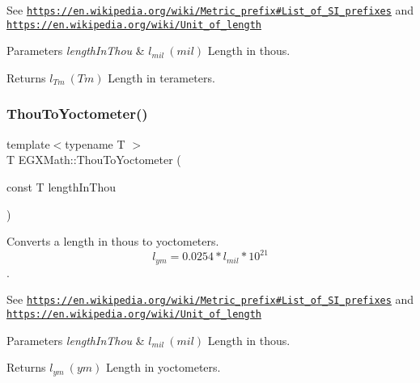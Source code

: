 See \href{https://en.wikipedia.org/wiki/Metric_prefix#List_of_SI_prefixes}{\tt https\+://en.\+wikipedia.\+org/wiki/\+Metric\+\_\+prefix\#\+List\+\_\+of\+\_\+\+S\+I\+\_\+prefixes} and \href{https://en.wikipedia.org/wiki/Unit_of_length}{\tt https\+://en.\+wikipedia.\+org/wiki/\+Unit\+\_\+of\+\_\+length} 
\begin{DoxyParams}{Parameters}
{\em length\+In\+Thou} & $ l_{mil}\ (mil)$ Length in thous. \\
\hline
\end{DoxyParams}
\begin{DoxyReturn}{Returns}
$ l_{Tm}\ (Tm)$ Length in terameters. 
\end{DoxyReturn}
\mbox{\label{group___e_g_x_math-_conversions-_length_conversions-_imperial-_thou-_s_i_ga9d6f9fc2ae199f7d67e0eff86cc17caf}} 
\subsubsection{\texorpdfstring{Thou\+To\+Yoctometer()}{ThouToYoctometer()}}
{\footnotesize\ttfamily template$<$typename T $>$ \\
T E\+G\+X\+Math\+::\+Thou\+To\+Yoctometer (\begin{DoxyParamCaption}\item[{const T}]{length\+In\+Thou }\end{DoxyParamCaption})}



Converts a length in thous to yoctometers. \[ l_{ym}=0.0254 * l_{mil} * 10^{21} \]. 

See \href{https://en.wikipedia.org/wiki/Metric_prefix#List_of_SI_prefixes}{\tt https\+://en.\+wikipedia.\+org/wiki/\+Metric\+\_\+prefix\#\+List\+\_\+of\+\_\+\+S\+I\+\_\+prefixes} and \href{https://en.wikipedia.org/wiki/Unit_of_length}{\tt https\+://en.\+wikipedia.\+org/wiki/\+Unit\+\_\+of\+\_\+length} 
\begin{DoxyParams}{Parameters}
{\em length\+In\+Thou} & $ l_{mil}\ (mil)$ Length in thous. \\
\hline
\end{DoxyParams}
\begin{DoxyReturn}{Returns}
$ l_{ym}\ (ym)$ Length in yoctometers. 
\end{DoxyReturn}
\mbox{\label{group___e_g_x_math-_conversions-_length_conversions-_imperial-_thou-_s_i_ga289b200bab4328ce7bcde4464d91c62a}} 
